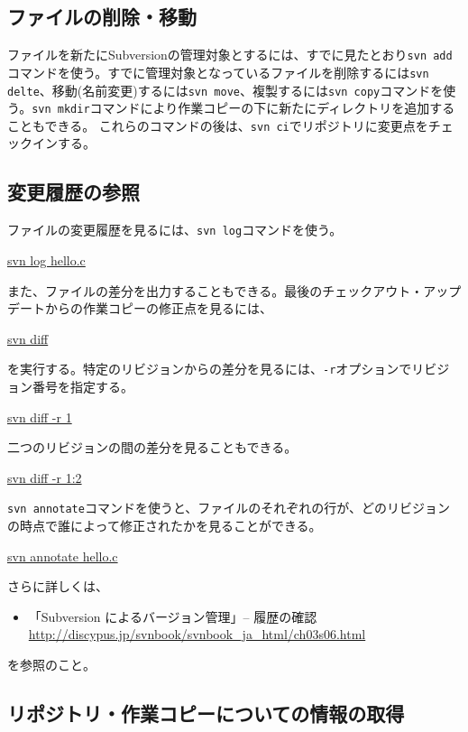 \subsection{ファイルの削除・移動}

ファイルを新たにSubversionの管理対象とするには、すでに見たとおり{\tt svn add}コマンドを使う。すでに管理対象となっているファイルを削除するには{\tt svn delte}、移動(名前変更)するには{\tt svn move}、複製するには{\tt svn copy}コマンドを使う。{\tt svn mkdir}コマンドにより作業コピーの下に新たにディレクトリを追加することもできる。
これらのコマンドの後は、{\tt svn ci}でリポジトリに変更点をチェックインする。

\subsection{変更履歴の参照}

ファイルの変更履歴を見るには、{\tt svn log}コマンドを使う。
\begin{commandline2}
\prompt \underline{svn log hello.c}
\end{commandline2} \noindent
また、ファイルの差分を出力することもできる。最後のチェックアウト・アップデートからの作業コピーの修正点を見るには、
\begin{commandline2}
\prompt \underline{svn diff}
\end{commandline2} \noindent
を実行する。特定のリビジョンからの差分を見るには、{\tt -r}オプションでリビジョン番号を指定する。
\begin{commandline2}
\prompt \underline{svn diff -r 1}
\end{commandline2} \noindent
二つのリビジョンの間の差分を見ることもできる。
\begin{commandline2}
\prompt \underline{svn diff -r 1:2}
\end{commandline2} \noindent
{\tt svn annotate}コマンドを使うと、ファイルのそれぞれの行が、どのリビジョンの時点で誰によって修正されたかを見ることができる。
\begin{commandline2}
\prompt \underline{svn annotate hello.c}
\end{commandline2} \noindent
さらに詳しくは、
\begin{itemize}
  \item 「Subversion によるバージョン管理」-- 履歴の確認 \\
    {\small \url{http://discypus.jp/svnbook/svnbook_ja_html/ch03s06.html}}
\end{itemize}
を参照のこと。

\subsection{リポジトリ・作業コピーについての情報の取得}

